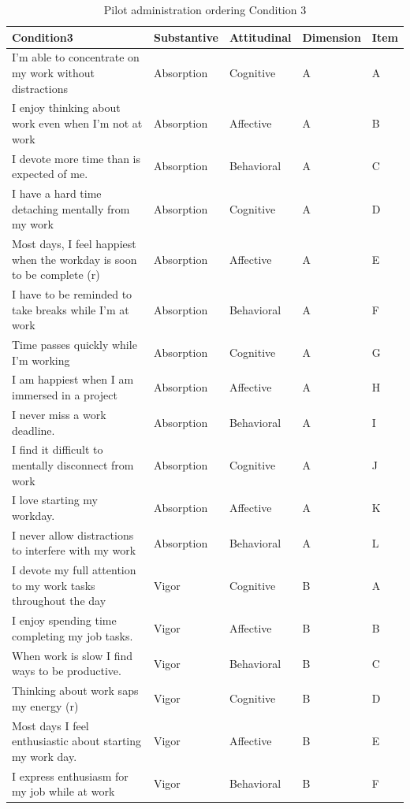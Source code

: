 \documentclass[
]{book}
\begin{document}
\begin{table}

\caption{\label{tab:cond3}Pilot administration ordering Condition 3}
\centering
\begin{tabular}[t]{l|l|l|l|l}
\hline
Condition3 & Substantive & Attitudinal & Dimension & Item\\
\hline
I’m able to concentrate on my work without distractions & Absorption & Cognitive & A & A\\
\hline
I enjoy thinking about work even when I’m not at work & Absorption & Affective & A & B\\
\hline
I devote more time than is expected of me. & Absorption & Behavioral & A & C\\
\hline
I have a hard time detaching mentally from my work & Absorption & Cognitive & A & D\\
\hline
Most days, I feel happiest when the workday is soon to be complete (r) & Absorption & Affective & A & E\\
\hline
I have to be reminded to take breaks while I’m at work & Absorption & Behavioral & A & F\\
\hline
Time passes quickly while I’m working & Absorption & Cognitive & A & G\\
\hline
I am happiest when I am immersed in a project & Absorption & Affective & A & H\\
\hline
I never miss a work deadline. & Absorption & Behavioral & A & I\\
\hline
I find it difficult to mentally disconnect from work & Absorption & Cognitive & A & J\\
\hline
I love starting my workday. & Absorption & Affective & A & K\\
\hline
I never allow distractions to interfere with my work & Absorption & Behavioral & A & L\\
\hline
I devote my full attention to my work tasks throughout the day & Vigor & Cognitive & B & A\\
\hline
I enjoy spending time completing my job tasks. & Vigor & Affective & B & B\\
\hline
When work is slow I find ways to be productive. & Vigor & Behavioral & B & C\\
\hline
Thinking about work saps my energy (r) & Vigor & Cognitive & B & D\\
\hline
Most days I feel enthusiastic about starting my work day. & Vigor & Affective & B & E\\
\hline
I express enthusiasm for my job while at work & Vigor & Behavioral & B & F\\

\end{tabular}
\end{table}
\end{document}
